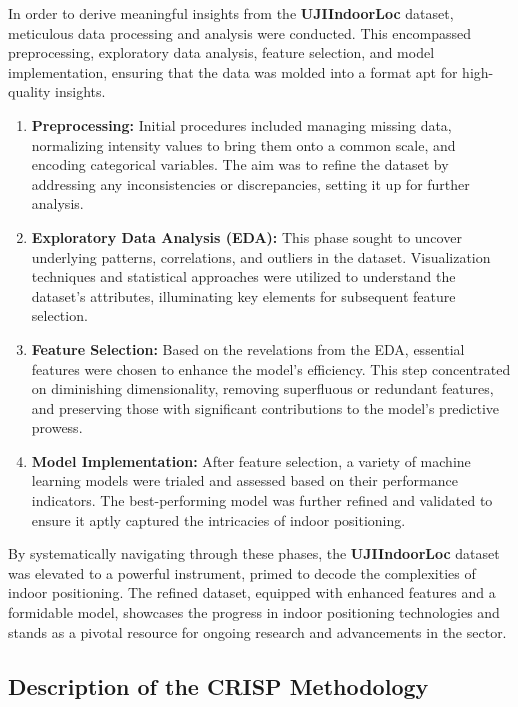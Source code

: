 \documentclass[conference]{IEEEtran}
\begin{document}
In order to derive meaningful insights from the \textbf{UJIIndoorLoc} dataset, meticulous data processing and analysis were conducted. This encompassed preprocessing, exploratory data analysis, feature selection, and model implementation, ensuring that the data was molded into a format apt for high-quality insights.

\begin{enumerate}
\item \textbf{Preprocessing:} Initial procedures included managing missing data, normalizing intensity values to bring them onto a common scale, and encoding categorical variables. The aim was to refine the dataset by addressing any inconsistencies or discrepancies, setting it up for further analysis.


\item \textbf{Exploratory Data Analysis (EDA):} This phase sought to uncover underlying patterns, correlations, and outliers in the dataset. Visualization techniques and statistical approaches were utilized to understand the dataset's attributes, illuminating key elements for subsequent feature selection.

\item \textbf{Feature Selection:} Based on the revelations from the EDA, essential features were chosen to enhance the model's efficiency. This step concentrated on diminishing dimensionality, removing superfluous or redundant features, and preserving those with significant contributions to the model's predictive prowess.

\item \textbf{Model Implementation:} After feature selection, a variety of machine learning models were trialed and assessed based on their performance indicators. The best-performing model was further refined and validated to ensure it aptly captured the intricacies of indoor positioning.
\end{enumerate}

By systematically navigating through these phases, the \textbf{UJIIndoorLoc} dataset was elevated to a powerful instrument, primed to decode the complexities of indoor positioning. The refined dataset, equipped with enhanced features and a formidable model, showcases the progress in indoor positioning technologies and stands as a pivotal resource for ongoing research and advancements in the sector.



\subsection{Description of the CRISP Methodology}
\label{sec:metodo_crisp}
\end{document}

